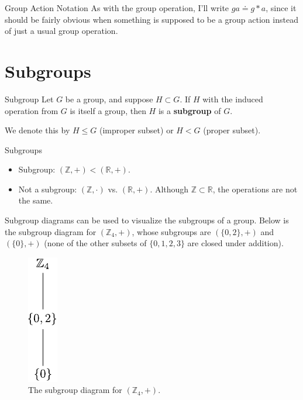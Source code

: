 \documentclass[10pt]{report}
\begin{document}
\begin{note}{Group Action Notation}{}
As with the group operation, I'll write $g a \doteq g * a$, since it should be fairly obvious when something is supposed to be a group action instead of just a usual group operation.
\end{note}


\section{Subgroups}

\begin{defn}{Subgroup}{}
Let $G$ be a group, and suppose $H \subset G$. If $H$ with the induced operation from $G$ is itself a group, then $H$ is a \textbf{subgroup} of $G$.

We denote this by $H \leq G$ (improper subset) or $H < G$ (proper subset).
\end{defn}

\begin{ex}{Subgroups}{}
\begin{itemize}
	\item Subgroup: $(\mathbb{Z}, +) < (\mathbb{R},+)$.
	\item Not a subgroup: $(\mathbb{Z}, \cdot)$ vs. $(\mathbb{R}, +)$. Although $\mathbb{Z} \subset \mathbb{R}$, the operations are not the same.
\end{itemize}
\end{ex}

Subgroup diagrams can be used to visualize the subgroups of a group. Below is the subgroup diagram for $(\mathbb{Z}_4, +)$, whose subgroups are $(\{0,2\}, +)$ and $(\{0\}, +)$ (none of the other subsets of $\{0,1,2,3\}$ are closed under addition).
\begin{figure}[H]
	\centering
	\includegraphics[scale=1]{fig/subgroup-ex.pdf}
	\caption{The subgroup diagram for $(\mathbb{Z}_4, +)$.}
\end{figure}
\end{document}
